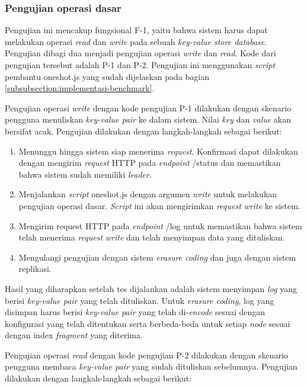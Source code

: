 \subsubsection{Pengujian operasi dasar}
\label{subsubsection:pengujian-operasi-dasar}

Pengujian ini mencakup fungsional F-1, yaitu bahwa sistem harus dapat melakukan operasi \textit{read} dan \textit{write} pada sebuah \textit{key-value store database}. Pengujian dibagi dua menjadi pengujian operasi \textit{write} dan \textit{read}. Kode dari pengujian tersebut adalah P-1 dan P-2. Pengujian ini menggunakan \textit{script} pembantu oneshot.js yang sudah dijelaskan pada bagian \ref{subsubsection:implementasi-benchmark}.

Pengujian operasi \textit{write} dengan kode pengujian P-1 dilakukan dengan skenario pengguna menuliskan \textit{key-value pair} ke dalam sistem. Nilai \textit{key} dan \textit{value} akan bersifat acak. Pengujian dilakukan dengan langkah-langkah sebagai berikut:

\begin{enumerate}
  \item Menunggu hingga sistem siap menerima \textit{request}. Konfirmasi dapat dilakukan dengan mengirim \textit{request} HTTP pada \textit{endpoint} /status dan memastikan bahwa sistem sudah memiliki \textit{leader}.
  \item Menjalankan \textit{script} oneshot.js dengan argumen \textit{write} untuk melakukan pengujian operasi dasar. \textit{Script} ini akan mengirimkan \textit{request} \textit{write} ke sistem.
  \item Mengirim request HTTP pada \textit{endpoint} /log untuk memastikan bahwa sistem telah menerima \textit{request} \textit{write} dan telah menyimpan data yang dituliskan.
  \item Mengulangi pengujian dengan sistem \textit{erasure coding} dan juga dengan sistem replikasi.
\end{enumerate}

Hasil yang diharapkan setelah tes dijalankan adalah sistem menyimpan \textit{log} yang berisi \textit{key-value pair} yang telah dituliskan. Untuk \textit{erasure coding}, log yang disimpan harus berisi \textit{key-value pair} yang telah di-\textit{encode} sesuai dengan konfigurasi yang telah ditentukan serta berbeda-beda untuk setiap \textit{node} sesuai dengan index \textit{fragment} yang diterima.

Pengujian operasi \textit{read} dengan kode pengujian P-2 dilakukan dengan skenario pengguna membaca \textit{key-value pair} yang sudah dituliskan sebelumnya. Pengujian dilakukan dengan langkah-langkah sebagai berikut:

